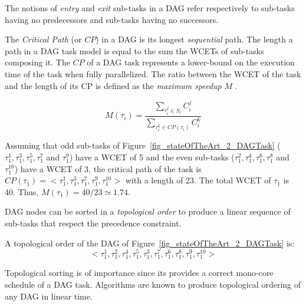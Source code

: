 \documentclass[main.tex]{subfiles}
\begin{document}
The notions of \emph{entry} and \emph{exit} sub-tasks in a DAG refer respectively to sub-tasks having no predecessors and sub-tasks having no successors.


The \emph{Critical Path} (or $CP$) in a DAG is its longest \emph{sequential} path. The length a path in a DAG task model is equal to the sum the WCETs of sub-tasks composing it. The $CP$ of a DAG task represents a lower-bound on the execution time of the task when fully parallelized. The ratio between the WCET of the task and the length of its CP is defined as the \emph{maximum speedup} $M$ \cite{Hill2008}.

\begin{displaymath}
    M(\tau_i) = \dfrac{ \underset{\tau_i^j \in S_i}{\sum} C_i^j}{ \underset{ \tau_i^k \in CP(\tau_i) }{\sum} C_i^k}
\end{displaymath}

\begin{example}
    Assuming that odd sub-tasks of Figure~\ref{fig_stateOfTheArt_2_DAGTask} 
    ($\tau_1^1 , \tau_1^3, \tau_1^5, \tau_1^7$ and $\tau_1^9$) have a WCET of 5 and the even sub-tasks 
    ($\tau_1^2 , \tau_1^4, \tau_1^6, \tau_1^8$ and $\tau_1^{10}$) have a WCET of 3, the critical path of the task is $CP(\tau_1) = <\tau_1^1 , \tau_1^3, \tau_1^7, \tau_1^9 , \tau_1^{10}>$ with a length of 23. The total WCET of $\tau_1$ is 40. Thus, $M(\tau_1) = 40/23 \simeq 1.74$. 
\end{example}

DAG nodes can be sorted in a \emph{topological order} to produce a linear sequence of sub-tasks that respect the precedence constraint.

\begin{example}
    A topological order of the DAG of Figure~\ref{fig_stateOfTheArt_2_DAGTask} is:
    $$< \tau_1^1 , \tau_1^2 , \tau_1^4 , \tau_1^5, \tau_1^3 , \tau_1^7 , \tau_1^6 , \tau_1^8 , \tau_1^9 , \tau_1^{10} >$$
\end{example}

Topological sorting is of importance since its provides a correct mono-core schedule of a DAG task. Algorithms are known to produce topological ordering of any DAG in linear time.\\
\end{document}
